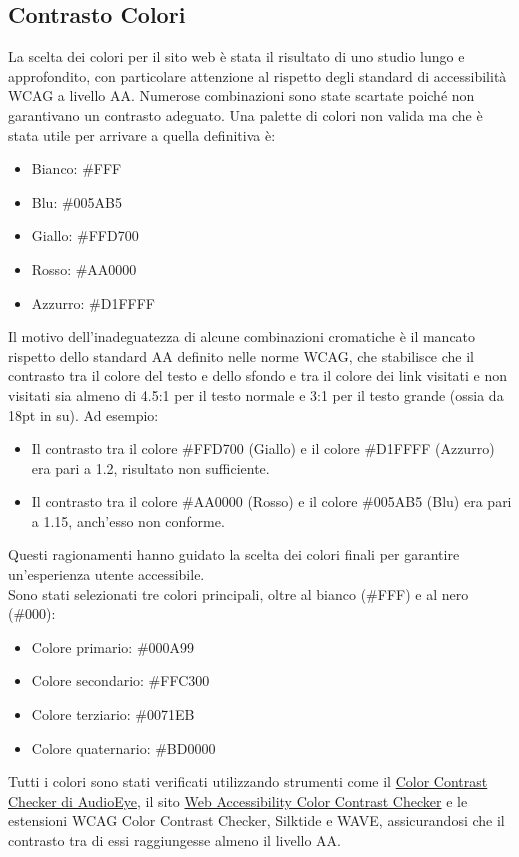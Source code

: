 \subsection{Contrasto Colori}
La scelta dei colori per il sito web è stata il risultato di uno studio lungo e approfondito, con particolare attenzione al rispetto degli standard di accessibilità WCAG a livello AA. Numerose combinazioni sono state scartate poiché non garantivano un contrasto adeguato.
Una palette di colori non valida ma che è stata utile per arrivare a quella definitiva è:
\begin{itemize}
    \item Bianco: \#FFF
    \item Blu: \#005AB5
    \item Giallo: \#FFD700
    \item Rosso: \#AA0000
    \item Azzurro: \#D1FFFF
\end{itemize}
Il motivo dell'inadeguatezza di alcune combinazioni cromatiche è il mancato rispetto dello standard AA definito nelle norme WCAG, che stabilisce che il contrasto tra il colore del testo e dello sfondo e tra il colore dei link visitati e non visitati sia almeno di 4.5:1 per il testo normale e 3:1 per il testo grande (ossia da 18pt in su).  
Ad esempio: 
\begin{itemize}
    \item Il contrasto tra il colore \#FFD700 (Giallo) e il colore \#D1FFFF (Azzurro) era pari a 1.2, risultato non sufficiente.
    \item Il contrasto tra il colore \#AA0000 (Rosso) e il colore \#005AB5 (Blu) era pari a 1.15, anch'esso non conforme.
\end{itemize}
Questi ragionamenti hanno guidato la scelta dei colori finali per garantire un'esperienza utente accessibile.
\\
Sono stati selezionati tre colori principali, oltre al bianco (\#FFF) e al nero (\#000):
\begin{itemize}
    \item Colore primario: \#000A99
    \item Colore secondario: \#FFC300
    \item Colore terziario: \#0071EB
    \item Colore quaternario: \#BD0000
\end{itemize}
Tutti i colori sono stati verificati utilizzando strumenti come il \href{https://www.audioeye.com/color-contrast-checker/}{Color Contrast Checker di AudioEye}, il sito \href{https://accessibleweb.com/color-contrast-checker/}{Web Accessibility Color Contrast Checker} e le estensioni WCAG Color Contrast Checker, Silktide e WAVE, assicurandosi che il contrasto tra di essi raggiungesse almeno il livello AA.
